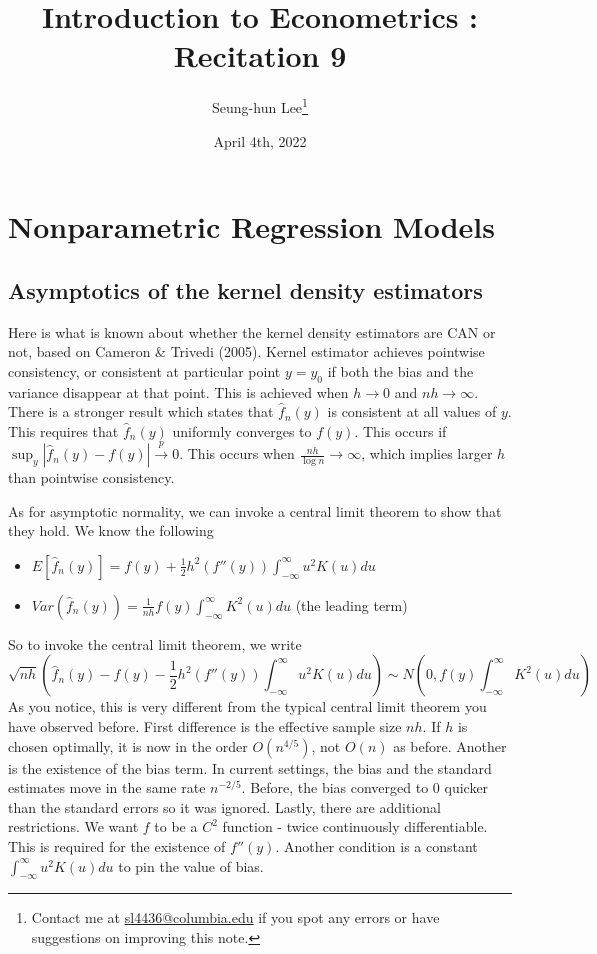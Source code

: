\documentclass[12pt]{article}
\title{Introduction to Econometrics \ROM{2}: Recitation 9}
\theoremstyle{definition}
\theoremstyle{property}
\theoremstyle{assumption}
\theoremstyle{example}
\theoremstyle{comment}
\begin{document}
\linespread{1.25}
\onehalfspacing

\author{Seung-hun Lee\footnote{Contact me at \href{mailto:sl4436@columbia.edu}{sl4436@columbia.edu} if you spot any errors or have suggestions on improving this note.}}
\date{April 4th, 2022}
\maketitle
\thispagestyle{firstpage}




\section{Nonparametric Regression Models}
\subsection{Asymptotics of the kernel density estimators}
Here is what is known about whether the kernel density estimators are CAN or not, based on Cameron \& Trivedi (2005). Kernel estimator achieves pointwise consistency, or consistent at particular point $y=y_0$ if both the bias and the variance disappear at that point. This is achieved when $h\to0$ and $nh\to\infty$. There is a stronger result which states that $\hat{f}_n(y)$ is consistent at all values of $y$. This requires that $\hat{f}_n(y)$ uniformly converges to $f(y)$. This occurs if $\sup_y |\hat{f}_n(y)-f(y)|\xrightarrow{p}0$. This occurs when $\frac{nh}{\log{n}}\to\infty$, which implies larger $h$ than pointwise consistency.   \par
As for asymptotic normality, we can invoke a central limit theorem to show that they hold. We know the following
\begin{itemize}
\item $E[\hat{f}_n(y)]=f(y)+\frac{1}{2}h^2(f''(y))\int_{-\infty}^\infty u^2K(u)du$
\item $Var(\hat{f}_n(y)) = \frac{1}{nh}f(y) \int_{-\infty}^\infty K^2(u)du$ (the leading term)
\end{itemize}
So to invoke the central limit theorem, we write
\[
\sqrt{nh}\left(\hat{f}_n(y) - f(y) - \frac{1}{2}h^2(f''(y))\int_{-\infty}^\infty u^2K(u)du\right)\sim N\left(0, f(y) \int_{-\infty}^\infty K^2(u)du\right)
\]
As you notice, this is very different from the typical central limit theorem you have observed before. First difference is the effective sample size $nh$. If $h$ is chosen optimally, it is now in the order $O(n^{4/5})$, not $O(n)$ as before. Another is the existence of the bias term. In current settings, the bias and the standard estimates move in the same rate $n^{-2/5}$. Before, the bias converged to 0 quicker than the standard errors so it was ignored. Lastly, there are additional restrictions. We want $f$ to be a $C^2$ function - twice continuously differentiable. This is required for the existence of $f''(y)$. Another condition is a constant  $\int_{-\infty}^\infty u^2K(u)du$ to pin the value of bias.\par
\end{document}
